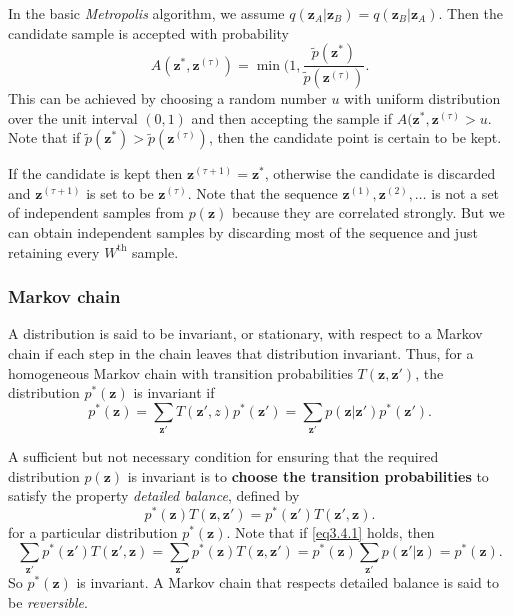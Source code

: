 \documentclass[a4paper]{book}
\newcommand{\mrm}{\mathrm}
\newcommand{\mbf}{\mathbf}
\newcommand{\zz}{\mbf z}
\newcommand{\tit}{\textit}
\begin{document}
In the basic \tit{Metropolis} algorithm, we assume $q(\zz_A|\zz_B) = q(\zz_B|\zz_A)$. Then the candidate sample is accepted with probability
\begin{equation}\label{}
  A(\zz^*,\zz^{(\tau)})=\min(1, \frac{\tilde p(\zz^*)}{\tilde p(\zz^{(\tau)})}.
\end{equation}
This can be achieved by choosing a random number $u$ with uniform distribution over the unit interval $(0,1)$ and then accepting the sample if $A(\zz^*,\zz^{(\tau)}>u$. Note that if $\tilde p(\zz^*)>\tilde p(\zz^{(\tau)})$, then the candidate point is certain to be kept.

If the candidate is kept then $\zz^{(\tau+1)} = \zz^*$, otherwise the candidate is discarded and $\zz^{(\tau+1)}$ is set to be $\zz^{(\tau)}$. Note that the sequence $\zz^{(1)}, \zz^{(2)}, \dots$ is not a set of independent samples from $p(\zz)$ because they are correlated strongly. But we can obtain independent samples by discarding most of the sequence and just retaining every $W^{\mrm{th}}$ sample.
\subsubsection*{Markov chain}
A distribution is said to be invariant, or stationary, with respect to a Markov chain if each step in the chain leaves that distribution invariant. Thus, for a homogeneous Markov chain with transition probabilities $T(\zz,\zz')$, the distribution $p^*(\zz)$ is invariant if
\begin{equation}\label{}
  p^*(\zz) = \sum_{\zz'}T(\zz',z)p^*(\zz') = \sum_{\zz'}p(\zz|\zz')p^*(\zz').
\end{equation}

A sufficient but not necessary condition for ensuring that the required distribution $p(\zz)$ is invariant is to \textbf{choose the transition probabilities} to satisfy the property \tit{detailed balance}, defined by
\begin{equation}\label{eq3.4.1}
  p^*(\zz)T(\zz,\zz') = p^*(\zz')T(\zz',\zz).
\end{equation}
for a particular distribution $p^*(\zz)$. Note that if \ref{eq3.4.1} holds, then
\begin{equation}\label{}
  \sum_{\zz'}p^*(\zz')T(\zz',\zz)=\sum_{\zz'}p^*(\zz)T(\zz,\zz')=p^*(\zz)\sum_{\zz'}p(\zz'|\zz)=p^*(\zz).
\end{equation}
So $p^*(\zz)$ is invariant. A Markov chain that respects detailed balance is said to be \tit{reversible}.
\end{document}
